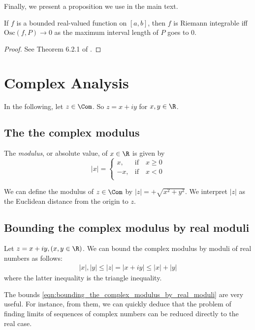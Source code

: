 \documentclass{article} %
\begin{document}
Finally, we present a proposition we use in the main text. 

\begin{proposition}
If $f$ is a bounded real-valued function on $[a,b]$, then $f$ is Riemann integrable iff $\text{Osc}(f,P) \to 0$ as the maximum interval length of $P$ goes to 0.
\label{prop:Riemann_integrable_iff_oscillation_goes_to_zero_as_partition_gets_finer}
\end{proposition}

\begin{proof}
See Theorem 6.2.1 of \cite{strichartz2000way}.	
\end{proof}

\section{Complex Analysis}

In the following, let $z \in \Com$. So $z = x+iy$ for $x,y \in \R$.  

\subsection{The the complex modulus} 

The \textit{modulus}, or absolute value, of $x \in \R$ is given by 
\[ |x| = 
\begin{cases}
x, & \text{if} \quad  x\geq 0 \\
-x, & \text{if} \quad x<0 \\ 	
\end{cases}
 \]

We can define the modulus of $z \in \Com$ by $|z| = + \sqrt{x^2 + y^2}$.   We interpret $|z|$ as the Euclidean distance from the origin to $z$. 

\subsection{Bounding the complex modulus by real moduli} 

 Let $z=x+iy, 	(x, y \in \R)$.   We can bound the complex modulus by moduli of real numbers as follows:
%
\begin{align}
|x|, |y| \leq |z|=|x+iy| \leq |x|+|y|
\label{eqn:bounding_the_complex_modulus_by_real_moduli_appendix} 
\end{align}
where the latter inequality is the triangle inequality. 

The bounds \eqref{eqn:bounding_the_complex_modulus_by_real_moduli}  are very useful.  For instance, from them, we can quickly deduce that the problem of finding limits of sequences of complex numbers can be reduced directly to the real case.
\end{document}
